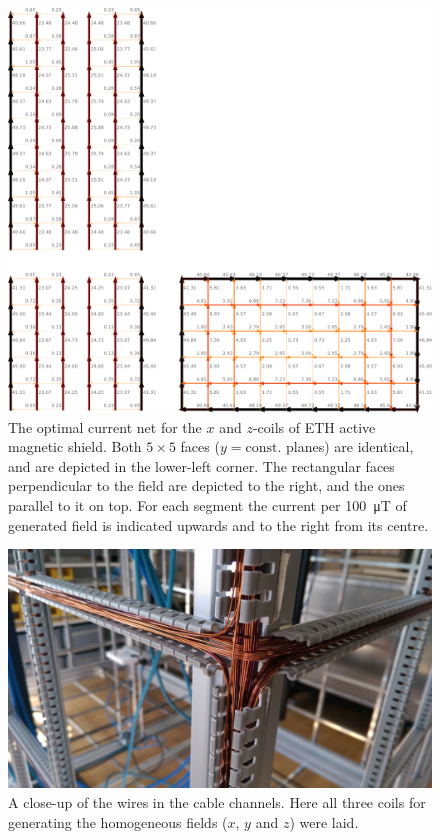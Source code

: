 \begin{figure}
  \centering
  \includegraphics[width=0.9\linewidth]{gfx/prototype/coil_design_x_100uT.pdf}
  \caption{The optimal current net for the $x$ and $z$-coils of ETH active magnetic shield. Both $5 \times 5$ faces ($y = \mathrm{const.}$ planes) are identical, and are depicted in the lower-left corner. The rectangular faces perpendicular to the field are depicted to the right, and the ones parallel to it on top. For each segment the current per \SI{100}{\micro\tesla} of generated field is indicated upwards and to the right from its centre.}\label{fig:prototype_coil_x_z_currents}
\end{figure}

\begin{figure}
  \centering
  \includegraphics[width=0.9\linewidth]{gfx/prototype/wires_close_up.jpg}
  \caption{A close-up of the wires in the cable channels. Here all three coils for generating the homogeneous fields ($x$, $y$ and $z$) were laid.}\label{fig:prototype_coil_wire_close-up}
\end{figure}

